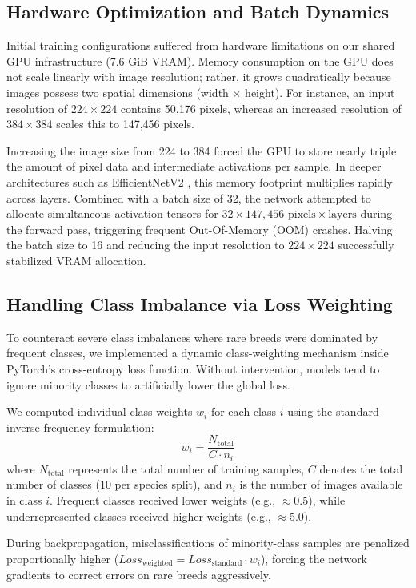 \subsection{Hardware Optimization and Batch Dynamics}
Initial training configurations suffered from hardware limitations on our shared GPU infrastructure (7.6 GiB VRAM). Memory consumption on the GPU does not scale linearly with image resolution; rather, it grows quadratically because images possess two spatial dimensions (width $\times$ height). For instance, an input resolution of $224 \times 224$ contains 50,176 pixels, whereas an increased resolution of $384 \times 384$ scales this to 147,456 pixels. 

Increasing the image size from 224 to 384 forced the GPU to store nearly triple the amount of pixel data and intermediate activations per sample. In deeper architectures such as EfficientNetV2 \cite{tan2021efficientnetv2}, this memory footprint multiplies rapidly across layers. Combined with a batch size of 32, the network attempted to allocate simultaneous activation tensors for $32 \times 147,456 \text{ pixels} \times \text{layers}$ during the forward pass, triggering frequent Out-Of-Memory (OOM) crashes. Halving the batch size to 16 and reducing the input resolution to $224 \times 224$ successfully stabilized VRAM allocation.

\subsection{Handling Class Imbalance via Loss Weighting}
To counteract severe class imbalances where rare breeds were dominated by frequent classes, we implemented a dynamic class-weighting mechanism inside PyTorch's cross-entropy loss function. Without intervention, models tend to ignore minority classes to artificially lower the global loss.

We computed individual class weights $w_i$ for each class $i$ using the standard inverse frequency formulation:
\begin{equation}
    w_i = \frac{N_{\text{total}}}{C \cdot n_i}
\end{equation}
where $N_{\text{total}}$ represents the total number of training samples, $C$ denotes the total number of classes (10 per species split), and $n_i$ is the number of images available in class $i$. Frequent classes received lower weights (e.g., $\approx 0.5$), while underrepresented classes received higher weights (e.g., $\approx 5.0$). 

During backpropagation, misclassifications of minority-class samples are penalized proportionally higher ($Loss_{\text{weighted}} = Loss_{\text{standard}} \cdot w_i$), forcing the network gradients to correct errors on rare breeds aggressively.


